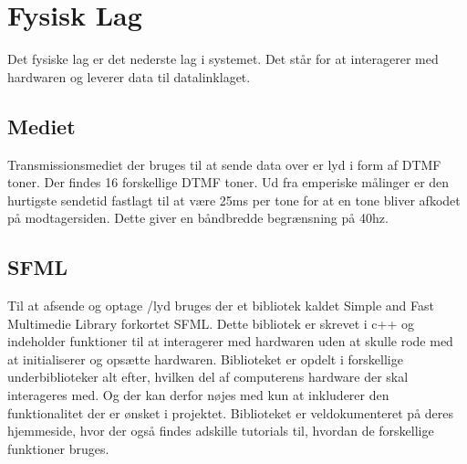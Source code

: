 \section{Fysisk Lag}
Det fysiske lag er det nederste lag i systemet. Det står for at interagerer med hardwaren og leverer data til datalinklaget. 

\subsection{Mediet}
Transmissionsmediet der bruges til at sende data over er lyd i form af DTMF toner. Der findes 16 forskellige DTMF toner. Ud fra emperiske målinger er den hurtigste sendetid fastlagt til at være 25ms per tone for at en tone bliver afkodet på modtagersiden. Dette giver en båndbredde begrænsning på 40hz.

\subsection{SFML}
Til at afsende og optage /lyd bruges der et bibliotek kaldet Simple and Fast Multimedie Library forkortet SFML. Dette bibliotek er skrevet i c++ og indeholder funktioner til at interagerer med hardwaren uden at skulle rode med at initialiserer og opsætte hardwaren. Biblioteket er opdelt i forskellige underbiblioteker alt efter, hvilken del af computerens hardware der skal interageres med. Og der kan derfor nøjes med kun at inkluderer den funktionalitet der er ønsket i projektet. Biblioteket er veldokumenteret på deres hjemmeside, hvor der også findes adskille tutorials til, hvordan de forskellige funktioner bruges.

